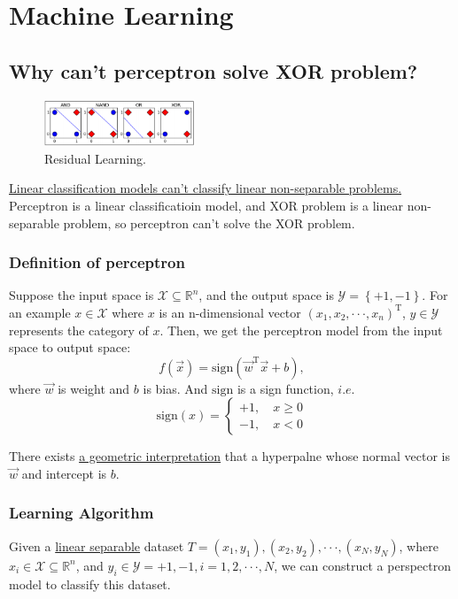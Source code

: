 \documentclass[10pt,onecolumn]{book}
\begin{document}
\chapter{Machine Learning}

\section{Why can't perceptron solve XOR problem?}
\begin{figure}[h]
\centering
\includegraphics[width=0.4\textwidth]{figures/XOR_problem.png}
\caption{Residual Learning.}
\label{fig:1-1_residual_learning}
\end{figure}
 \uline{Linear classification models can't classify linear non-separable problems.} Perceptron is a linear classificatioin model, and XOR problem is a linear non-separable problem, so perceptron can't solve the XOR problem.

\subsection{Definition of perceptron}
Suppose the input space is $\mathcal{X} \subseteq \mathbb{R}^n$, and the output space is $\mathcal{Y} = \left\{+1, -1\right\}$. For an example $x \in \mathcal{X}$ where $x$ is an n-dimensional vector $(x_{1}, x_{2}, \cdot \cdot \cdot, x_{n})^\mathrm{T}$, $y \in \mathcal{Y}$ represents the category of $x$. Then, we get the perceptron model from the input space to output space: 
\begin{equation}
f(\vec{x}) = \mathrm{sign}(\vec{w}^\mathrm{T} \vec{x} + b),
\end{equation}
where $\vec{w}$ is weight and $b$ is bias. And $\mathrm{sign}$ is a sign function, $i. e.$
\begin{equation}
\mathrm{sign}(x)=
\left\{
	\begin{array}{ll}
		+1, \quad x \ge 0  \\
		-1, \quad x < 0
	\end{array}
\right.
\end{equation}

There exists \uline{a geometric interpretation} that a hyperpalne whose normal vector is $\vec{w}$ and intercept is $b$.

\subsection{Learning Algorithm}
Given a \uline{linear separable} dataset $T = {(x_{1}, y_{1}), (x_{2}, y_{2}), \cdot \cdot \cdot, (x_{N}, y_{N})}$, where $x_{i} \in \mathcal{X} \subseteq \mathbb{R}^n$, and $y_{i} \in \mathcal{Y} = {+1, -1}, i = 1, 2, \cdot \cdot \cdot, N$, we can construct a perspectron model to classify this dataset. 
\end{document}
